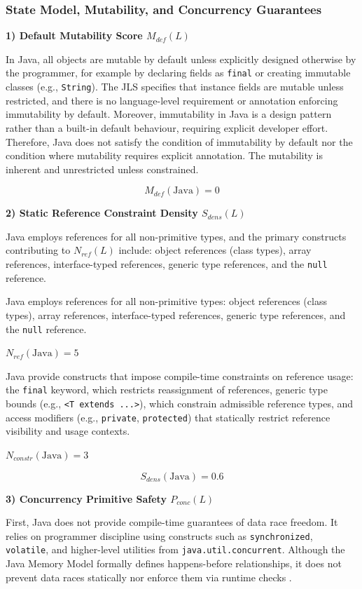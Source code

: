 \subsubsection{State Model, Mutability, and Concurrency Guarantees}

\textbf{1) Default Mutability Score $M_{def}(L)$}

In Java, all objects are mutable by default unless explicitly designed otherwise by the programmer, for example by declaring fields as \texttt{final} or creating immutable classes (e.g., \texttt{String}). The JLS specifies that instance fields are mutable unless restricted, and there is no language-level requirement or annotation enforcing immutability by default. Moreover, immutability in Java is a design pattern rather than a built-in default behaviour, requiring explicit developer effort. Therefore, Java does not satisfy the condition of immutability by default nor the condition where mutability requires explicit annotation. The mutability is inherent and unrestricted unless constrained.

\[
    M_{def}(\text{Java}) = 0
\]

\textbf{2) Static Reference Constraint Density $S_{dens}(L)$}

Java employs references for all non-primitive types, and the primary constructs contributing to $N_{ref}(L)$ include: object references (class types), array references, interface-typed references, generic type references, and the \texttt{null} reference.

Java employs references for all non-primitive types: object references (class types), array references, interface-typed references, generic type references, and the \texttt{null} reference.

$N_{ref}(\text{Java}) = 5$

Java provide constructs that impose compile-time constraints on reference usage: the \texttt{final} keyword, which restricts reassignment of references, generic type bounds (e.g., \texttt{<T extends ...>}), which constrain admissible reference types, and access modifiers (e.g., \texttt{private}, \texttt{protected}) that statically restrict reference visibility and usage contexts.

$N_{constr}(\text{Java}) = 3$

\[
    S_{dens}(\text{Java}) = 0.6
\]

\textbf{3) Concurrency Primitive Safety $P_{conc}(L)$}

First, Java does not provide compile-time guarantees of data race freedom. It relies on programmer discipline using constructs such as \texttt{synchronized}, \texttt{volatile}, and higher-level utilities from \texttt{java.util.concurrent}. Although the Java Memory Model formally defines happens-before relationships, it does not prevent data races statically nor enforce them via runtime checks \cite{buchholzjava}.

